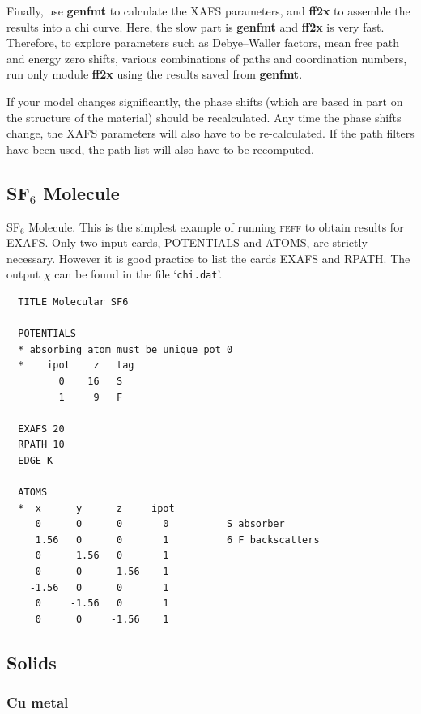 \documentclass[11pt,oneside]{report} %
\newcommand{\program}[1]{\textsc{#1}}
\newcommand{\feff}{\program{feff}}
\newcommand{\file}[1]{`\texttt{#1}'}
\newcommand{\module}[1]{\textrm{\bf{#1}}}
\begin{document}
Finally, use \module{genfmt} to calculate the XAFS parameters, and \module{ff2x} to
assemble the results into a chi curve. Here, the slow part is \module{genfmt}
and \module{ff2x} is very fast. Therefore, to explore parameters such as
Debye--Waller factors, mean free path and energy zero shifts, various
combinations of paths and coordination numbers, run only module \module{ff2x}
using the results saved from \module{genfmt}.

If your model changes significantly, the phase shifts (which are based
in part on the structure of the material) should be recalculated.
Any time the phase shifts change, the XAFS parameters will also have to be
re-calculated. If the path filters have been used, the path list will
also have to be recomputed.



\subsection{SF$_6$ Molecule}
\label{sec:Molecule}
SF$_6$ Molecule. This is the simplest example of running {\feff} to obtain
results for EXAFS. Only two input cards, POTENTIALS and ATOMS, are strictly necessary. However it is good practice to list the cards EXAFS and RPATH.  The output $\chi$ can be found in the file \file{chi.dat}.

\begin{verbatim}
  TITLE Molecular SF6
  
  POTENTIALS
  * absorbing atom must be unique pot 0
  *    ipot    z   tag
         0    16   S        
         1     9   F
  
  EXAFS 20
  RPATH 10
  EDGE K
  
  ATOMS
  *  x      y      z     ipot
     0      0      0       0          S absorber
     1.56   0      0       1          6 F backscatters
     0      1.56   0       1
     0      0      1.56    1
    -1.56   0      0       1
     0     -1.56   0       1
     0      0     -1.56    1
\end{verbatim}




\subsection{Solids}
\label{sec:Solid}

\subsubsection{Cu metal}
\label{sec:Cu-metal}
\end{document}
